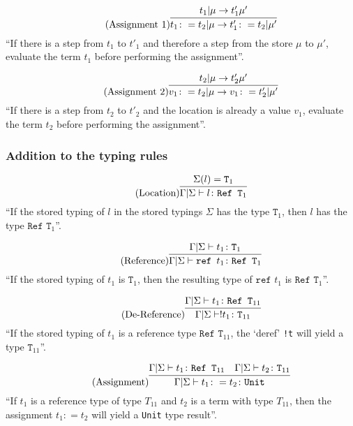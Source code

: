 \begin{equation*}
    \tag{Assignment 1}
    \infer{
        t_1 \colon = t_2 | \mu \rightarrow t'_1 \colon = t_2 | \mu'
    }{
        t_1 | \mu \rightarrow t'_1 \mu'
    }
\end{equation*}
``If there is a step from $t_1$ to $t'_1$ and therefore a step
from the store $\mu$ to $\mu'$, evaluate the term $t_1$ before
performing the assignment''.

\begin{equation*}
    \tag{Assignment 2}
    \infer{
        v_1 \colon = t_2 | \mu \rightarrow v_1 \colon = t'_2 | \mu'
    }{
        t_2 | \mu \rightarrow t'_2 \mu'
    }
\end{equation*}
``If there is a step from $t_2$ to $t'_2$ and the location
is already a value $v_1$, evaluate the term $t_2$ before
performing the assignment''.

\subsubsection{Addition to the typing rules \cite{pierce2002ProgLang}}
\begin{equation*}
    \tag{Location}
    \infer{
        \Gamma | \Sigma \vdash l \colon \texttt{Ref T}_1
    }{
        \Sigma(l) = \texttt{T}_1
    }
\end{equation*}
``If the stored typing of $l$ in the stored typings $\Sigma$ has
the type $\texttt{T}_1$, then $l$ has the type $\texttt{Ref T}_1$''.

\begin{equation*}
    \tag{Reference}
    \infer{
        \Gamma | \Sigma \vdash \texttt{ref } t_1 \colon \texttt{Ref T}_1
    }{
        \Gamma | \Sigma \vdash t_1 \colon \texttt{T}_1
    }
\end{equation*}
``If the stored typing of $t_1$ is $\texttt{T}_1$, then the resulting type
of $\texttt{ref } t_1$ is $\texttt{Ref T}_1$''.

\begin{equation*}
    \tag{De-Reference}
    \infer{
        \Gamma | \Sigma \vdash !t_1 \colon \texttt{T}_{11}
    }{
        \Gamma | \Sigma \vdash t_1 \colon \texttt{Ref T}_{11}
    }
\end{equation*}
``If the stored typing of $t_1$ is a reference type $\texttt{Ref T}_{11}$,
the `deref' \texttt{!t} will yield a type $\texttt{T}_{11}$''.

\begin{equation*}
    \tag{Assignment}
    \infer{
        \Gamma | \Sigma \vdash t_1 \colon = t_2 \colon \texttt{Unit}
    }{
        \Gamma | \Sigma \vdash t_1 \colon \texttt{Ref T}_{11}
        &
        \Gamma | \Sigma \vdash t_2 \colon \texttt{T}_{11}
    }
\end{equation*}
``If $t_1$ is a reference type of type $T_{11}$ and $t_2$ is a term
with type $T_{11}$, then the assignment $t_1 \colon = t_2$ will
yield a \texttt{Unit} type result''.
